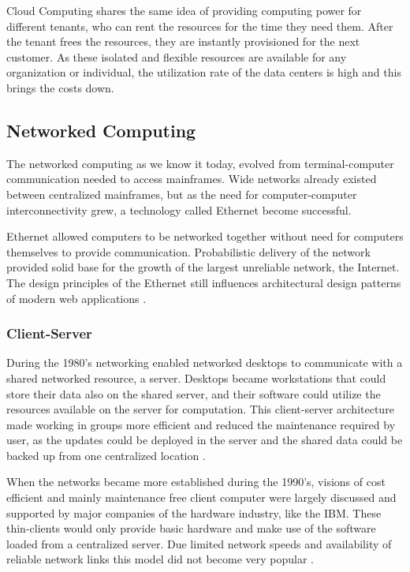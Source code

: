 \documentclass{tktltiki}
\begin{document}
Cloud Computing shares the same idea of providing computing power for different tenants, who can rent the resources for the time they need them.  After the tenant frees the resources, they are instantly provisioned for the next customer.  As these isolated and flexible resources are available for any organization or individual,  the utilization rate of the data centers is high and this brings the costs down. 
  


\subsection{Networked Computing}

The networked computing as we know it today, evolved from terminal-computer communication needed to access mainframes.  Wide networks already existed between centralized mainframes, but as the need for computer-computer interconnectivity grew, a technology called Ethernet become successful.

Ethernet allowed computers to be networked together without need for computers themselves to provide communication.  Probabilistic delivery of the network provided solid base for the growth of the largest unreliable network, the Internet.  The design principles of the Ethernet still influences architectural design patterns of modern web applications \cite{Ethernet}.


\subsubsection{Client-Server}

During the 1980's networking enabled networked desktops to communicate with a shared networked resource, a server.  Desktops became workstations that could store their data also on the shared server, and their software could utilize the resources available on the server for computation.  This client-server architecture made working in groups more efficient and reduced the maintenance required by user, as the updates could be deployed in the server and the shared data could be backed up from one centralized location \cite{ClientServer96, CloudComputing}.

When the networks became more established during the 1990's, visions of cost efficient and mainly maintenance free client computer were largely discussed and supported by major companies of the hardware industry, like the IBM.  These thin-clients would only provide basic hardware and make use of the software loaded from a centralized server.  Due limited network speeds and availability of reliable network links this model did not become very popular \cite{InTheClouds07}.
\end{document}
